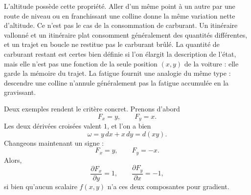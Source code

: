 L’altitude possède cette propriété. Aller d’un même point à un autre par une route de niveau ou en franchissant une colline donne la même variation nette d’altitude. Ce n’est pas le cas de la consommation de carburant. Un itinéraire vallonné et un itinéraire plat consomment généralement des quantités différentes, et un trajet en boucle ne restitue pas le carburant brûlé. La quantité de carburant restant est certes bien définie si l’on élargit la description de l’état, mais elle n’est pas une fonction de la seule position \((x,y)\) de la voiture : elle garde la mémoire du trajet. La fatigue fournit une analogie du même type : descendre une colline n’annule généralement pas la fatigue accumulée en la gravissant.

\begin{classroomqa}
\end{classroomqa}

Deux exemples rendent le critère concret. Prenons d’abord
\begin{equation}
 F_x=y,\qquad F_y=x.
 \label{eq:sm6-exact-example}
\end{equation}
Les deux dérivées croisées valent \(1\), et l’on a bien
\begin{equation}
 \omega=y\,dx+x\,dy=d(xy).
 \label{eq:sm6-exact-example-potential}
\end{equation}
Changeons maintenant un signe :
\begin{equation}
 F_x=y,\qquad F_y=-x.
 \label{eq:sm6-inexact-example}
\end{equation}
Alors,
\begin{equation}
 \frac{\partial F_x}{\partial y}=1,
 \qquad
 \frac{\partial F_y}{\partial x}=-1,
 \label{eq:sm6-inexact-cross-derivatives}
\end{equation}
si bien qu’aucun scalaire \(f(x,y)\) n’a ces deux composantes pour gradient.

